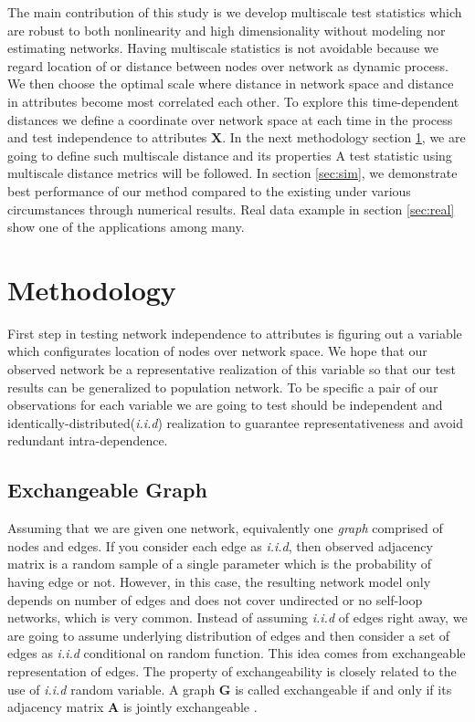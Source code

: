 \documentclass[12pt]{article}
\theoremstyle{definition}
\begin{document}
The main contribution of this study is we develop multiscale test statistics which are robust to both nonlinearity and high dimensionality without modeling nor estimating networks. Having multiscale statistics is not avoidable because we regard location of or distance between nodes over network as dynamic process. We then choose the optimal scale where distance in network space and distance in attributes become most correlated each other. To explore this time-dependent distances we define a coordinate over network space at each time in the process and test independence to attributes $\mathbf{X}$. In the next methodology section \ref{sec:method}, we are going to define such multiscale distance and its properties A test statistic using multiscale distance metrics will be followed. In section \ref{sec:sim}, we demonstrate best performance of our method compared to the existing under various circumstances through numerical results. Real data example in section \ref{sec:real} show one of the applications among many.  
	
	
\bigskip
\section{Methodology}
\label{sec:method}
	
First step in testing network independence to attributes is figuring out a variable which configurates location of nodes over network space. We hope that our observed network be a representative realization of this variable so that our test results can be generalized to population network. To be specific a pair of our observations for each variable we are going to test should be independent and identically-distributed(\textit{i.i.d}) realization to guarantee representativeness and avoid redundant intra-dependence.  
	
\subsection{Exchangeable Graph}
	
Assuming that we are given one network, equivalently one \textit{graph} comprised of nodes and edges. If you consider each edge as \textit{i.i.d}, then observed adjacency matrix is a random sample of a single parameter which is the probability of having edge or not. However, in this case, the resulting network model only depends on number of edges \citep{orbanz2015bayesian} and does not cover undirected or no self-loop networks, which is very common. Instead of assuming \textit{i.i.d} of edges right away, we are going to assume underlying distribution of edges and then consider a set of edges as \textit{i.i.d} conditional on random function. This idea comes from exchangeable representation of edges.
The property of exchangeability is closely related to the use of \textit{i.i.d} random variable. A graph $\mathbf{G}$ is called exchangeable if and only if its adjacency matrix $\mathbf{A}$ is jointly exchangeable \citep{orbanz2015bayesian}. 
	
\end{document}
